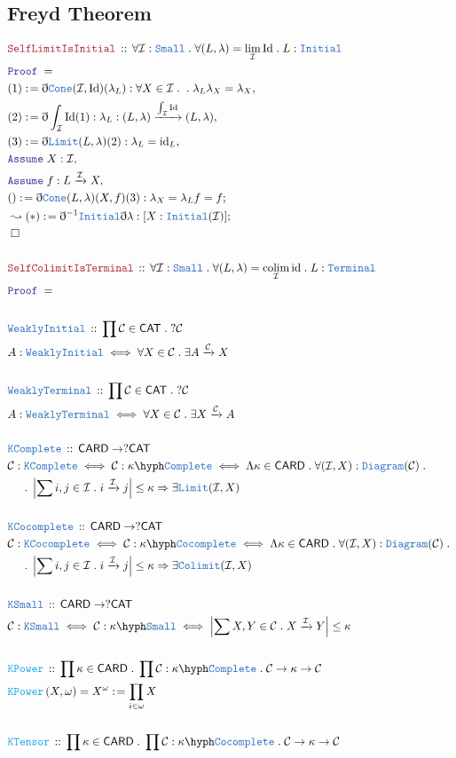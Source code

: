 \documentclass[12pt]{scrartcl}
\newcommand{\TYPE}[1]{\textcolor{NavyBlue}{\mathtt{#1}}}
\newcommand{\FUNC}[1]{\textcolor{Cerulean}{\mathtt{#1}}}
\newcommand{\LOGIC}[1]{\textcolor{Blue}{\mathtt{#1}}}
\newcommand{\THM}[1]{\textcolor{Maroon}{\mathtt{#1}}}
\renewcommand{\.}{\; . \;}
\newcommand{\de}{: \kern 0.1pc =}
\newcommand{\Act}[1]{\left( #1 \right)}
\newcommand{\Theorem}[2]{& \THM{#1} \, :: \, #2 \\ & \Proof = \\ }
\newcommand{\DeclareType}[2]{& \TYPE{#1} \, :: \, #2 \\}
\newcommand{\DefineType}[3]{& #1 : \TYPE{#2} \iff #3 \\}
\newcommand{\DefineNamedType}[4]{& #1 : \TYPE{#2} \iff #3 \iff #4 \\}
\newcommand{\DeclareFunc}[2]{& \FUNC{#1} \, :: \, #2 \\}
\newcommand{\DefineNamedFunc}[4]{&  \FUNC{#1}\Act{#2} = #3 \de #4 \\}
\newcommand{\NewLine}{\\ & \kern 1pc}
\newcommand{\Page}[1]{ \begin{align*} #1 \end{align*}   }
\newcommand{ \bd }{ \ByDef }
\DeclareMathOperator*{\id}{id}
\newcommand{\Arrow}{\xrightarrow}
\newcommand{\Say}[3]{& #1 \de #2 : #3, \\}
\newcommand{\Conclude}[3]{& #1 \de #2 : #3; \\}
\newcommand{\DeriveConclude}[3]{& \leadsto #1 \de #2 : #3 ; \\}
\newcommand{\Assume}[2]{& \LOGIC{Assume} \; #1 : #2, \\}
\newcommand{\QED}{\; \square}
\newcommand{\EndProof}{& \QED \\}
\newcommand{\ByDef}{\eth}
\newcommand{\Proof}{\LOGIC{Proof} \; }
\DeclareMathOperator*{\colim}{colim}
\newcommand{\C}{\mathcal{C}}
\newcommand{\I}{\mathcal{I}}
\newcommand{\CAT}{\mathsf{CAT}}
\begin{document}
\subsection{Freyd Theorem}
\Page{
	\Theorem{SelfLimitIsInitial}{ \forall \I : \TYPE{Small} \. \forall (L,\lambda) = \lim_{\I} \mathrm{Id} \.
		L : \TYPE{Initial}  }
	\Say{(1)}{\bd \TYPE{Cone}(\I,\mathrm{Id})(\lambda_L)}{\forall X \in \I \. 
		 \.
		\lambda_L \lambda_X = \lambda_X
	}
	\Say{(2)}{\bd \int_\I \mathrm{Id} (1)}{ \lambda_L : (L,\lambda) \Arrow{\int_{\I} \mathrm{Id}} (L,\lambda)}
	\Say{(3)}{\bd \TYPE{Limit}(L,\lambda)(2)}{ \lambda_L = {\id}_L}
	\Assume{X}{\I}
	\Assume{f}{L \Arrow{\I} X}
	\Conclude{()}{\bd \TYPE{Cone}(L,\lambda)(X,f)(3)}{  \lambda_X =  \lambda_L f  = f  }
	\DeriveConclude{(*)}{\bd^{-1} \TYPE{Initial} \bd \lambda}{ [X : \TYPE{Initial}(\I)]}
	\EndProof
	\\
	\Theorem{SelfColimitIsTerminal}{\forall \I : \TYPE{Small} \. \forall (L,\lambda) = \colim_{\I} \mathrm{\id} \. 
		L : \TYPE{Terminal}}
	\\
	\DeclareType{WeaklyInitial}{\prod \C \in \CAT \. ?\C}
	\DefineType{A}{WeaklyInitial}{\forall X \in \C \. \exists A \Arrow{\C} X}
	\\
	\DeclareType{WeaklyTerminal}{\prod \C \in \CAT \. ?\C}
	\DefineType{A}{WeaklyTerminal}{\forall X \in \C \. \exists X \Arrow{\C} A}
	\\
	\DeclareType{KComplete}{\mathsf{CARD} \to ?\CAT}
	\DefineNamedType{\C}{KComplete}{\C : \kappa\hyph\TYPE{Complete}}{
		\Lambda \kappa \in \mathsf{CARD} \. 
		\forall (\I,X) : \TYPE{Diagram}(\C) \. \NewLine \. 
		\left| \sum i,j \in \I \. i \Arrow{\I} j   \right| \le \kappa \Rightarrow
		\exists \TYPE{Limit}(\I,X)
	}
	\\
	\DeclareType{KCocomplete}{\mathsf{CARD} \to ?\CAT}
	\DefineNamedType{\C}{KCocomplete}{\C : \kappa\hyph\TYPE{Cocomplete}}{
		\Lambda \kappa \in \mathsf{CARD} \. 
		\forall (\I,X) : \TYPE{Diagram}(\C) \. \NewLine \. 
		\left| \sum i,j \in \I \. i \Arrow{\I} j   \right| \le \kappa \Rightarrow
		\exists \TYPE{Colimit}(\I,X)
	}
	\\
	\DeclareType{KSmall}{\mathsf{CARD} \to ?\CAT}
	\DefineNamedType{\C}{KSmall}{\C : \kappa\hyph\TYPE{Small}}{\left| \sum X,Y \in \C \. X \Arrow{\I} Y   \right| \le \kappa}
	\\
	\DeclareFunc{KPower}{\prod \kappa \in \mathsf{CARD} \. \prod \C : \kappa\hyph\TYPE{Complete} \. \C \to \kappa \to \C}
	\DefineNamedFunc{KPower}{X,\omega}{X^\omega}{\prod_{i \in \omega} X }
	\\
	\DeclareFunc{KTensor}{\prod \kappa \in \mathsf{CARD} \. \prod \C : \kappa\hyph\TYPE{Cocomplete} \. \C \to \kappa \to \C}
}
\end{document}
